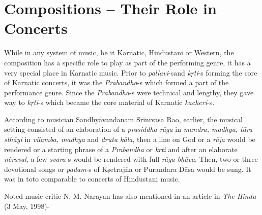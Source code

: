 \vspace{-.3cm}

\section*{Compositions – Their Role in Concerts}

While in any system of music, be it Karnatic, Hindustani or Western, the composition has a specific role to play as part of the performing genre, it has a very special place in Karnatic music. Prior to \textit{pallavi}-s\break and \textit{kṛti}-s forming the core of Karnatic concerts, it was the \textit{Praban\break dha}-s which formed a part of the performance genre. Since the \textit{Prabandha}-s were technical and lengthy, they gave way to \textit{kṛti}-s which became the core material of Karnatic \textit{kacheri}-s.

According to musician Sandhyāvandanam Srinivasa Rao, earlier, the musical setting consisted of an elaboration of a \textit{prasiddha rāga} in \textit{mandra, madhya, tāra sthāyi} in \textit{vilamba, madhya} and \textit{druta kāla}, then a line on God or a \textit{rāja} would be rendered or a starting phrase of a \textit{Prabandha} or \textit{kṛti} and after an elaborate \textit{nêraval}, a few \textit{svara}-s would be rendered with full \textit{rāga bhāva}. Then, two or three devotional songs or \textit{padam}-s of Kṣetrajña or Purandara Dāsa would be sung. It was in toto comparable to concerts of Hindustani music.

Noted music critic N. M. Narayan has also mentioned in an article in \textit{The Hindu} (3 May, 1998)-

